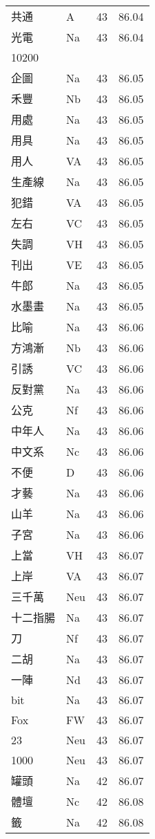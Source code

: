 \documentclass[twocolumn]{book}
\begin{document}
\begin{supertabular}{llrr}
共通 & A & 43 &  86.04\\
光電 & Na & 43 &  86.04\\
10200\\
企圖 & Na & 43 &  86.05\\
禾豐 & Nb & 43 &  86.05\\
用處 & Na & 43 &  86.05\\
用具 & Na & 43 &  86.05\\
用人 & VA & 43 &  86.05\\
生產線 & Na & 43 &  86.05\\
犯錯 & VA & 43 &  86.05\\
左右 & VC & 43 &  86.05\\
失調 & VH & 43 &  86.05\\
刊出 & VE & 43 &  86.05\\
牛郎 & Na & 43 &  86.05\\
水墨畫 & Na & 43 &  86.05\\
比喻 & Na & 43 &  86.06\\
方鴻漸 & Nb & 43 &  86.06\\
引誘 & VC & 43 &  86.06\\
反對黨 & Na & 43 &  86.06\\
公克 & Nf & 43 &  86.06\\
中年人 & Na & 43 &  86.06\\
中文系 & Nc & 43 &  86.06\\
不便 & D & 43 &  86.06\\
才藝 & Na & 43 &  86.06\\
山羊 & Na & 43 &  86.06\\
子宮 & Na & 43 &  86.06\\
上當 & VH & 43 &  86.07\\
上岸 & VA & 43 &  86.07\\
三千萬 & Neu & 43 &  86.07\\
十二指腸 & Na & 43 &  86.07\\
刀 & Nf & 43 &  86.07\\
二胡 & Na & 43 &  86.07\\
一陣 & Nd & 43 &  86.07\\
bit & Na & 43 &  86.07\\
Fox & FW & 43 &  86.07\\
23 & Neu & 43 &  86.07\\
1000 & Neu & 43 &  86.07\\
罐頭 & Na & 42 &  86.07\\
體壇 & Nc & 42 &  86.08\\
籤 & Na & 42 &  86.08\\

\end{supertabular}
\end{document}
